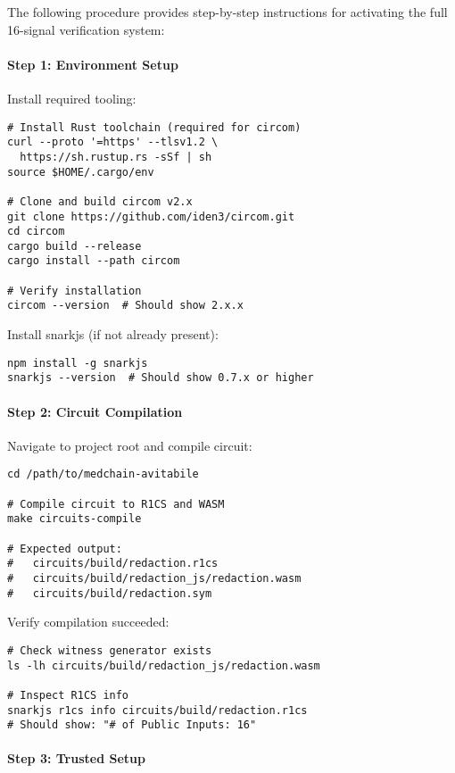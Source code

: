 The following procedure provides step-by-step instructions for activating the full 16-signal verification system:

\paragraph{Step 1: Environment Setup}

Install required tooling:

\begin{verbatim}
# Install Rust toolchain (required for circom)
curl --proto '=https' --tlsv1.2 \
  https://sh.rustup.rs -sSf | sh
source $HOME/.cargo/env

# Clone and build circom v2.x
git clone https://github.com/iden3/circom.git
cd circom
cargo build --release
cargo install --path circom

# Verify installation
circom --version  # Should show 2.x.x
\end{verbatim}

Install snarkjs (if not already present):

\begin{verbatim}
npm install -g snarkjs
snarkjs --version  # Should show 0.7.x or higher
\end{verbatim}

\paragraph{Step 2: Circuit Compilation}

Navigate to project root and compile circuit:

\begin{verbatim}
cd /path/to/medchain-avitabile

# Compile circuit to R1CS and WASM
make circuits-compile

# Expected output:
#   circuits/build/redaction.r1cs
#   circuits/build/redaction_js/redaction.wasm
#   circuits/build/redaction.sym
\end{verbatim}

Verify compilation succeeded:

\begin{verbatim}
# Check witness generator exists
ls -lh circuits/build/redaction_js/redaction.wasm

# Inspect R1CS info
snarkjs r1cs info circuits/build/redaction.r1cs
# Should show: "# of Public Inputs: 16"
\end{verbatim}

\paragraph{Step 3: Trusted Setup}


